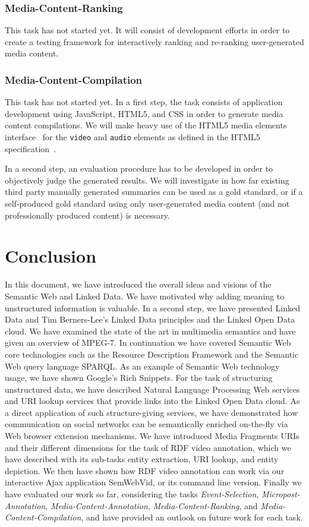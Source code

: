 \documentclass[runningheads,a4paper]{llncs}
\begin{document}
\subsubsection{Media-Content-Ranking}
This task has not started yet. It will consist of development efforts in order to create a testing framework for interactively ranking and re-ranking user-generated media content. 

\subsubsection{Media-Content-Compilation}
This task has not started yet. In a first step, the task consists of application development using JavaScript, HTML5, and CSS in order to generate media content compilations. We will make heavy use of the HTML5 media elements interface~\cite{mediaelements} for the \texttt{video} and \texttt{audio} elements as defined in the HTML5 specification~\cite{w3c_html5}.

In a second step, an evaluation procedure has to be developed in order to objectively judge the generated results. We will investigate in how far existing third party manually generated summaries can be used as a gold standard, or if a self-produced gold standard using only user-generated media content (and not professionally produced content) is necessary.
 
\section{Conclusion}
In this document, we have introduced the overall ideas and visions of the Semantic Web and Linked Data. We have motivated why adding meaning to unstructured information is valuable. In a second step, we have presented Linked Data and Tim Berners-Lee's Linked Data principles and the Linked Open Data cloud. We have examined the state of the art in multimedia semantics and have given an overview of MPEG-7. In continuation we have covered Semantic Web core technologies such as the Resource Description Framework and the Semantic Web query language SPARQL. As an example of Semantic Web technology usage, we have shown Google's Rich Snippets. For the task of structuring unstructured data, we have described Natural Language Processing Web services and URI lookup services that provide links into the Linked Open Data cloud. As a direct application of such structure-giving services, we have demonstrated how communication on social networks can be semantically enriched on-the-fly via Web browser extension mechanisms. We have introduced Media Fragments URIs and their different dimensions for the task of RDF video annotation, which we have described with its sub-tasks entity extraction, URI lookup, and entity depiction. We then have shown how RDF video annotation can work via our interactive Ajax application SemWebVid, or its command line version. Finally we have evaluated our work so far, considering the tasks \emph{Event-Selection}, \emph{Micropost-Annotation}, \emph{Media-Content-Annotation}, \emph{Media-Content-Ranking}, and \emph{Media-Content-Compilation}, and have provided an outlook on future work for each task.
\end{document}

